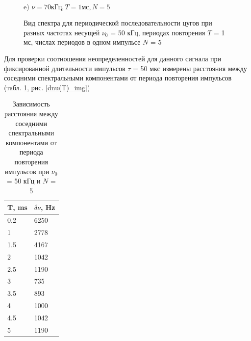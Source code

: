 \documentclass[a4paper,12pt]{article} %
\begin{document}
\begin{figure}[h!]
\begin{minipage}[h!]{0.47\linewidth}
 \\e) $\nu = 70 кГц, T = 1 мс, N = 5$
\end{minipage}
\caption{Вид спектра для периодической последовательности цугов при разных частотах несущей $\nu_0$ = 50 кГц, периодах повторения $T$ = 1 мс, числах
периодов в одном импульсе $N$ = 5}
\label{спектр_цуги}
\end{figure}

Для проверки соотношения неопределенностей для данного сигнала при фиксированной длительности импульсов $\tau$ = 50 мкс измерены расстояния между соседними спектральными компонентами от периода повторения импульсов (табл. \ref{dnu(T)_tbl}, рис. \ref{dnu(T)_img})

\begin{table}[h!]
\caption{Зависимость расстояния между соседними спектральными компонентами от периода повторения импульсов при $\nu_0$ = 50 кГц и $N$ = 5} \label{dnu(T)_tbl}
\begin{tabular}{|l|l|}
\hline
T, ms & $\delta \nu$, Hz \\ \hline
0.2   & 6250    \\ \hline
1     & 2778    \\ \hline
1.5   & 4167    \\ \hline
2     & 1042    \\ \hline
2.5   & 1190    \\ \hline
3     & 735     \\ \hline
3.5   & 893     \\ \hline
4     & 1000    \\ \hline
4.5   & 1042    \\ \hline
5     & 1190    \\ \hline
\end{tabular}
\end{table}
\end{document}
